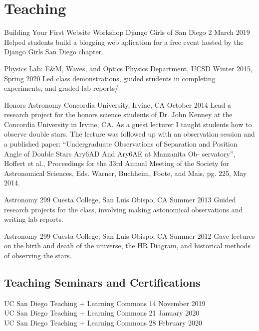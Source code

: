 \section{Teaching}

    {Building Your First Website Workshop}
    {Django Girls of San Diego}
    {2 March 2019}
Helped students build a blogging web aplication for a free event hosted by the Django Girls San Diego chapter.

    {Physics Lab: E\&M, Waves, and Optics}
    {Physics Department, UCSD}
    {Winter 2015, Spring 2020}
Led class demonstrations, guided students in completing experiments, and graded lab reports/

    {Honors Astronomy}
    {Concordia University, Irvine, CA}
    {October 2014}
Lead a research project for the honors science students of Dr. John Kenney at the Concordia University in Irvine, CA.
As a guest lecturer I taught students how to observe double stars.
The lecture was followed up with an observation session and a published paper:
``Undergraduate Observations of Separation and Position Angle of Double Stars Ary6AD And Ary6AE at Manzanita Ob- servatory'', Hoffert et al., Proceedings for the 33rd Annual Meeting of the Society for Astronomical Sciences, Eds. Warner, Buchheim, Foote, and Mais, pg. 225, May 2014.

    {Astronomy 299}
    {Cuesta College, San Luis Obispo, CA}
    {Summer 2013}
Guided research projects for the class, involving making astonomical observations and writing lab reports.

    {Astronomy 299}
    {Cuesta College, San Luis Obispo, CA}
    {Summer 2012}
Gave lectures on the birth and death of the universe, the HR Diagram, and historical methods of observing the stars.

\subsection{Teaching Seminars and Certifications}
    {UC San Diego Teaching + Learning Commons}
    {14 November 2019}\\
    {UC San Diego Teaching + Learning Commons}
    {21 January 2020}\\
    {UC San Diego Teaching + Learning Commons}
    {28 February 2020}
